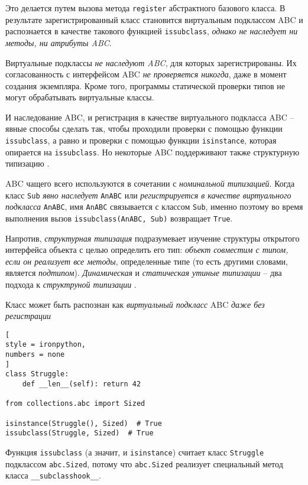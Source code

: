 \documentclass[%
	11pt,
	a4paper,
	utf8,
		]{article}
\begin{document}
Это делается путем вызова метода \verb*|register| абстрактного базового класса. В результате зарегистрированный класс становится виртуальным подклассом ABC и распознается в качестве такового функцией \verb*|issubclass|, \emph{\color{red}однако не наследует ни методы, ни атрибуты ABC}.

{\color{red}
	Виртуальные подклассы \emph{не наследуют ABC}, для которых зарегистрированы. Их согласованность с интерфейсом ABC \emph{не проверяется никогда}, даже в момент создания экземпляра. Кроме того, программы статической проверки типов не могут обрабатывать виртуальные классы.
}

И наследование ABC, и регистрация в качестве виртуального подкласса ABC -- явные способы сделать так, чтобы проходили проверки с помощью функции \verb*|issubclass|, а равно и проверки с помощью функции \verb*|isinstance|, которая опирается на \verb*|issubclass|. Но некоторые ABC поддерживают также структурную типизацию \cite[]{ramalho:python-2022}.

ABC чащего всего используются в сочетании с \emph{номинальной типизацией}. Когда класс \verb*|Sub| \emph{явно наследует} \verb*|AnABC| или \emph{регистрируется в качестве виртуального подкласса} \verb*|AnABC|, имя \verb*|AnABC| связывается с классом \verb*|Sub|, именно поэтому во время выполнения вызов \verb|issubclass(AnABC, Sub)| возвращает \verb*|True|.

Напротив, \emph{структурная типизация} подразумевает изучение структуры открытого интерфейса объекта с целью определить его тип: \emph{объект совместим с типом, если он реализует все методы}, определенные типе (то есть другими словами, является \emph{подтипом}). \emph{Динамическая} и \emph{статическая утиные типизации} -- два подхода к \emph{структруной типизации} \cite[]{ramalho:python-2022}.

Класс может быть распознан как \emph{виртуальный подкласс} ABC \emph{даже без регистрации}

\begin{lstlisting}[
style = ironpython,
numbers = none
]
class Struggle:
    def __len__(self): return 42
    
from collections.abc import Sized

isinstance(Struggle(), Sized)  # True
issubclass(Struggle, Sized)  # True
\end{lstlisting}

Функция \verb*|issubclass| (а значит, и \verb*|isinstance|) считает класс \verb*|Struggle| подклассом \verb*|abc.Sized|, потому что \verb*|abc.Sized| реализует специальный метод класса \verb*|__subclasshook__|. 
\end{document}
